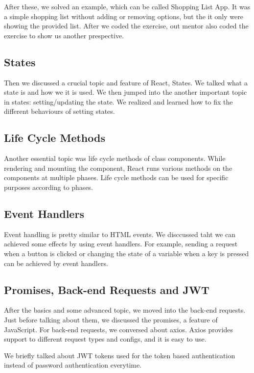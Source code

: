 After these, we solved an example, which can be called Shopping List App. It was a simple shopping list without adding or removing options, but the it only were showing the provided list. After we coded the exercise, out mentor also coded the exercise to show us another prespective.

\subsection{States}

Then we discussed a crucial topic and feature of React, States. We talked what a state is and how we it is used. We then jumped into the another important topic in states: setting/updating the state. We realized and learned how to fix the different behaviours of setting states.

\subsection{Life Cycle Methods}

Another essential topic was life cycle methods of class components. While rendering and mounting the component, React runs various methods on the components at multiple phases. Life cycle methods can be used for specific purposes according to phases.

\subsection{Event Handlers}

Event handling is pretty similar to HTML events. We disccussed taht we can achieved some effects by using event handlers. For example, sending a request when a button is clicked or changing the state of a variable when a key is pressed can be achieved by event handlers.

\subsection{Promises, Back-end Requests and JWT}

After the basics and some advanced topic, we moved into the back-end requests. Just before talking about them, we discussed the promises, a feature of JavaScript. For back-end requests, we conversed about axios. Axios provides support to different request types and configs, and it is easy to use.

We briefly talked about JWT tokens used for the token based authentication instead of password authentication everytime.





